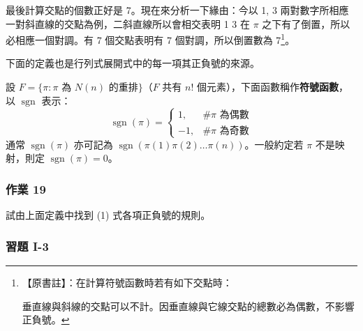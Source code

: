 最後計算交點的個數正好是 7。現在來分析一下緣由：今以 1, 3 兩對數字所相應一對斜直線的交點為例，二斜直線所以會相交表明 1 3 在 $\pi$ 之下有了倒置，所以必相應一個對調。有 7 個交點表明有 7 個對調，所以倒置數為 7\footnote{\begin{minipage}[t]{0.95\linewidth}【原書註】：在計算符號函數時若有如下交點時：\par\smallskip
\centering
{}\par\smallskip
\raggedright 垂直線與斜線的交點可以不計。因垂直線與它線交點的總數必為偶數，不影響正負號。
\end{minipage}}。

下面的定義也是行列式展開式中的每一項其正負號的來源。

\begin{definition}\label{def:b6s-1-7}
設 $F = \{ \pi : \pi \text{ 為 } N(n) \text{ 的重排} \}$（$F$ 共有 $n!$ 個元素），下面函數稱作\textbf{符號函數}，以 $\operatorname{sgn}$ 表示：
\[ \operatorname{sgn}(\pi) = \begin{cases}
1, & \#\pi \text{ 為偶數} \\
-1, & \#\pi \text{ 為奇數}
\end{cases} \]
通常 $\operatorname{sgn}(\pi)$ 亦可記為 $\operatorname{sgn}(\pi(1)\pi(2)\dots\pi(n))$。一般約定若 $\pi$ 不是映射，則定 $\operatorname{sgn}(\pi) = 0$。
\end{definition}

\subsubsection*{作業 19}\label{hw:b6s-1-19}
試由上面定義中找到 (1) 式各項正負號的規則。

\subsubsection*{習題 I-3}\label{sec:b6s-ex1-3}

